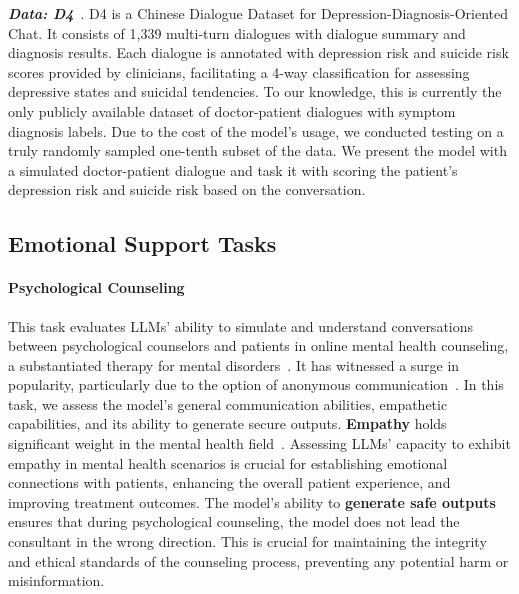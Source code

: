 \textbf{\textit{Data: D4}}~\citep{yao-etal-2022-d4}. D4 is a Chinese Dialogue Dataset for Depression-Diagnosis-Oriented Chat. It consists of 1,339 multi-turn dialogues with dialogue summary and diagnosis results. Each dialogue is annotated with depression risk and suicide risk scores provided by clinicians, facilitating a 4-way classification for assessing depressive states and suicidal tendencies. To our knowledge, this is currently the only publicly available dataset of doctor-patient dialogues with symptom diagnosis labels.
Due to the cost of the model's usage, we conducted testing on a truly randomly sampled one-tenth subset of the data. We present the model with a simulated doctor-patient dialogue and task it with scoring the patient's depression risk and suicide risk based on the conversation.

\subsection{Emotional Support Tasks}

\paragraph*{Psychological Counseling} This task evaluates LLMs' ability to simulate and understand conversations between psychological counselors and patients in online mental health counseling, a substantiated therapy for mental disorders~\citep{reynolds2013impact}. It has witnessed a surge in popularity, particularly due to the option of anonymous communication~\citep{fu2020effectiveness}. In this task, we assess the model's general communication abilities, empathetic capabilities, and its ability to generate secure outputs. \textbf{Empathy} holds significant weight in the mental health field~\citep{rains2020support}. Assessing LLMs' capacity to exhibit empathy in mental health scenarios is crucial for establishing emotional connections with patients, enhancing the overall patient experience, and improving treatment outcomes. The model's ability to \textbf{generate safe outputs} ensures that during psychological counseling, the model does not lead the consultant in the wrong direction. This is crucial for maintaining the integrity and ethical standards of the counseling process, preventing any potential harm or misinformation.

